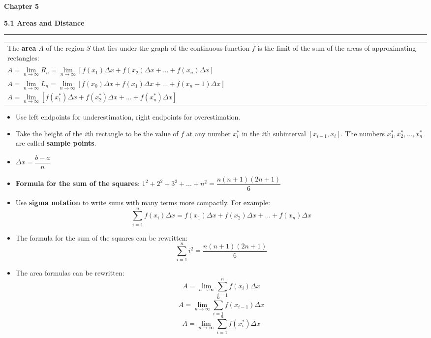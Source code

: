 \documentclass[fleqn]{article}
\begin{document}
\Huge\textbf{Chapter 5}
\vspace{16pt}

\begin{center}
\Large\textbf{5.1 Areas and Distance}

\noindent\hfill\rule{0.3\textwidth}{.4pt}\hfill
\vspace{12pt}

\large
\def\arraystretch{1.3}
{\setlength{\tabcolsep}{16pt}
\begin{tabularx}{.9\textwidth}{|X|}
\hline
	\vspace{1pt}
	The \textbf{area} $A$ of the region $S$ that lies under the graph of the continuous function $f$ is the limit of the sum of the areas of approximating rectangles: \\[10pt]

	$A = \underset{n \to \infty}{\lim} R_n = \underset{n \to \infty}{\lim} [f(x_1) \Delta x + f(x_2) \Delta x + ... + f(x_n) \Delta x]$ \\[10pt]
	$A = \underset{n \to \infty}{\lim} L_n = \underset{n \to \infty}{\lim} [f(x_0) \Delta x + f(x_1) \Delta x + ... + f(x_n-1) \Delta x]$ \\[10pt]
	$A = \underset{n \to \infty}{\lim} [f(x_1^*) \Delta x + f(x_2^*) \Delta x + ... + f(x_n^*) \Delta x]$ \\[16pt]
\hline
\end{tabularx}}
\vspace{12pt}

\begin{itemize}
	\item Use left endpoints for underestimation, right endpoints for overestimation. 
	\item Take the height of the $i$th rectangle to be the value of $f$ at any number $x_i^*$ in the $i$th subinterval $[x_{i-1}, x_i]$. The numbers $x_1^*, x_2^*, ... , x_n^*$ are called \textbf{sample points}.
	\item $\Delta x = \dfrac{b-a}{n}$ 
	\item \textbf{Formula for the sum of the squares}: $1^2 + 2^2 +3^2 + ... + n^2 = \dfrac {n(n+1)(2n+1)}{6}$
	\item Use \textbf{sigma notation} to write sums with many terms more compactly. For example:  \[\sum_{i=1}^n f(x_i) \Delta x = f(x_1) \Delta x + f(x_2) \Delta x + ... + f(x_n) \Delta x\]
	\item The formula for the sum of the squares can be rewritten: \[\sum_{i=1}^n i^2 = \dfrac{n(n+1)(2n+1)}{6}\]
	\item The area formulas can be rewritten: 
		\[A = \underset{n \to \infty}{\lim} \sum_{i=1}^n f(x_i) \Delta x\]
		\[A = \underset{n \to \infty}{\lim} \sum_{i=1}^n f(x_{i-1}) \Delta x\]
		\[A = \underset{n \to \infty}{\lim} \sum_{i=1}^n f(x_i^*) \Delta x\]
\end{itemize}
\end{center}
\pagebreak
\end{document}
